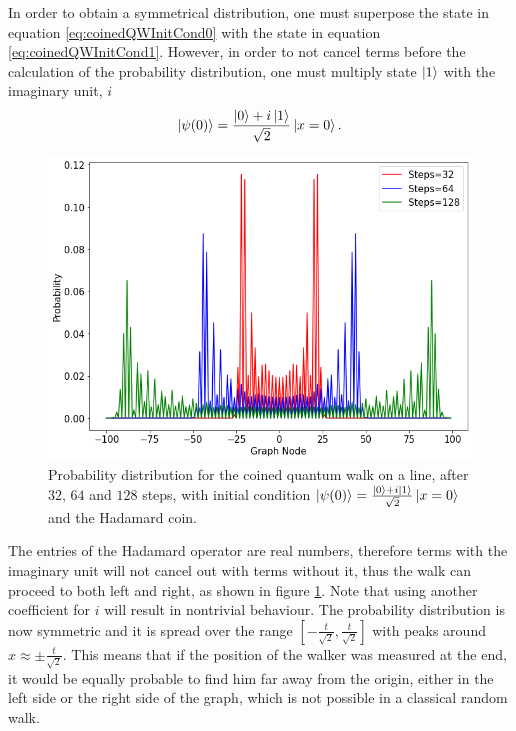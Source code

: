 \documentclass[../../dissertation.tex]{subfiles}
\begin{document}
In order to obtain a symmetrical distribution, one must superpose the state in
equation \eqref{eq:coinedQWInitCond0} with the state in equation
\ref{eq:coinedQWInitCond1}. However, in order to not cancel terms before the
calculation of the probability distribution, one must multiply state $\ket{1}$
with the imaginary unit, $i$ 
\begin{equation}
	\ket{\psi(0)} = \frac{\ket{0}+i\ket{1}}{\sqrt{2}}\ket{x=0}.
	\label{eq:coinedSimulSupInit}
\end{equation}
\begin{figure}[!ht]
	\centering
	\includegraphics[scale=0.40]{img/CoinedQuantumWalk/CoinedMultiple_psi01_3264128}
	\caption{Probability distribution for the coined quantum walk on a line, after $32$, $64$ and $128$ steps, with initial condition $\ket{\psi(0)}=\frac{\ket{0}+i\ket{1}}{\sqrt{2}}\ket{x=0}$ and the Hadamard coin.} 
	\label{fig:coinedQWDist01}
\end{figure}
The entries of the Hadamard operator are real numbers, therefore terms
with the imaginary unit will not cancel out with terms without it, thus the
walk can proceed to both left and right, as shown in figure
\ref{fig:coinedQWDist01}. Note that using another coefficient for $i$ will result in nontrivial behaviour. The probability distribution is now symmetric and it
is spread over the range $[-\frac{t}{\sqrt{2}},\frac{t}{\sqrt{2}}]$ with peaks
around $x \approx \pm \frac{t}{\sqrt{2}}$. This means that if the position of
the walker was measured at the end, it would be equally probable to find him far away from the origin,
either in the left side or the right side of the graph, which is not possible
in a classical random walk.\par 
\end{document}

